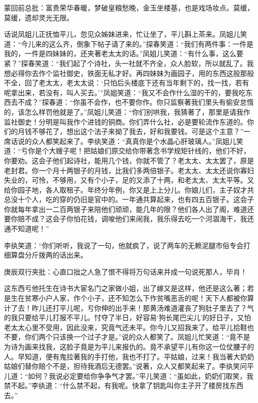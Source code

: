 \begin{parag}
    \begin{note}蒙回前总批：富贵荣华春暖，梦破皇粮愁晚，金玉坐楼基，也是戏场妆点。莫缓，莫缓，遗却灵光无限。\end{note}
\end{parag}


\begin{parag}
    话说凤姐儿正抚恤平儿，忽见众姊妹进来，忙让坐了，平儿斟上茶来。凤姐儿笑道：“今儿来的这么齐，倒象下帖子请了来的。”探春笑道：“我们有两件事：一件是我的，一件是四妹妹的，还夹著老太太的话。”凤姐儿笑道：“有什么事，这么要紧？”探春笑道：“我们起了个诗社，头一社就不齐全，众人脸软，所以就乱了。我想必得你去作个监社御史，铁面无私才好。再四妹妹为画园子，用的东西这般那般不全，回了老太太，老太太说：‘只怕后头楼底下还有当年剩下的，找一找，若有呢拿出来，若没有，叫人买去。’”凤姐笑道：“我又不会作什么湿的干的，要我吃东西去不成？”探春道：“你虽不会作，也不要你作。你只监察著我们里头有偷安怠惰的，该怎么样罚他就是了。”凤姐儿笑道：“你们别哄我，我猜著了，那里是请我作监社御史！分明是叫我作个进钱的铜商。你们弄什么社，必是要轮流作东道的。你们的月钱不够花了，想出这个法子来拗了我去，好和我要钱。可是这个主意？”一席话说的众人都笑起来了。李纨笑道：“真真你是个水晶心肝玻璃人。”凤姐儿笑道：“亏你是个大嫂子呢！把姑娘们原交给你带著念书学规矩针线的，他们不好，你要劝。这会子他们起诗社，能用几个钱，你就不管了？老太太、太太罢了，原是老封君。你一个月十两银子的月钱，比我们多两倍银子。老太太、太太还说你寡妇失业的，可怜，不够用，又有个小子，足的又添了十两，和老太太、太太平等。又给你园子地，各人取租子。年终分年例，你又是上上分儿。你娘儿们，主子奴才共总没十个人，吃的穿的仍旧是官中的。一年通共算起来，也有四五百银子。这会子你就每年拿出一二百两银子来陪他们顽顽，能几年的限？他们各人出了阁，难道还要你赔不成？这会子你怕花钱，调唆他们来闹我，我乐得去吃一个河涸海干，我还通不知道呢！”
\end{parag}


\begin{parag}
    李纨笑道：“你们听听，我说了一句，他就疯了，说了两车的无赖泥腿市俗专会打细算盘分斤拨两的话出来。\begin{note}庚辰双行夹批：心直口拙之人急了恨不得将万句话来并成一句说死那人，毕肖！\end{note}这东西亏他托生在诗书大宦名门之家做小姐，出了嫁又是这样，他还是这么著；若是生在贫寒小户人家，作个小子，还不知怎么下作贫嘴恶舌的呢！天下人都被你算计了去！昨儿还打平儿呢，亏你伸的出手来！那黄汤难道灌丧了狗肚子里去了？气的我只要给平儿打报不平儿。忖夺了半日，好容易‘狗长尾巴尖儿’的好日子，又怕老太太心里不受用，因此没来，究竟气还未平。你今儿又招我来了。给平儿拾鞋也不要，你们两个只该换一个过子才是。”说的众人都笑了。凤姐儿忙笑道：“竟不是为诗为画来找我，这脸子竟是为平儿来报仇的。竟不承望平儿有你这一位仗腰子的人。早知道，便有鬼拉著我的手打他，我也不打了。平姑娘，过来！我当著大奶奶姑娘们替你赔个不是，担待我酒后无德罢。”说著，众人又都笑起来了。李纨笑问平儿道：“如何？我说必定要给你争争气才罢。”平儿笑道：“虽如此，奶奶们取笑，我禁不起。”李纨道：“什么禁不起，有我呢。快拿了钥匙叫你主子开了楼房找东西去。”
\end{parag}


